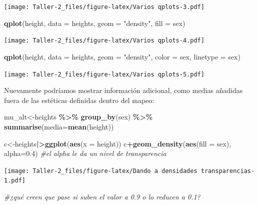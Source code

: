 \documentclass[
]{article}
\newenvironment{Shaded}{\begin{snugshade}}{\end{snugshade}}
\newcommand{\AttributeTok}[1]{\textcolor[rgb]{0.13,0.29,0.53}{#1}}
\newcommand{\CommentTok}[1]{\textcolor[rgb]{0.56,0.35,0.01}{\textit{#1}}}
\newcommand{\FloatTok}[1]{\textcolor[rgb]{0.00,0.00,0.81}{#1}}
\newcommand{\FunctionTok}[1]{\textcolor[rgb]{0.13,0.29,0.53}{\textbf{#1}}}
\newcommand{\NormalTok}[1]{#1}
\newcommand{\OtherTok}[1]{\textcolor[rgb]{0.56,0.35,0.01}{#1}}
\newcommand{\SpecialCharTok}[1]{\textcolor[rgb]{0.81,0.36,0.00}{\textbf{#1}}}
\newcommand{\StringTok}[1]{\textcolor[rgb]{0.31,0.60,0.02}{#1}}
\begin{document}
\texttt{[image: Taller-2\_files/figure-latex/Varios qplots-3.pdf]}

\begin{Shaded}
\begin{Highlighting}[]
\FunctionTok{qplot}\NormalTok{(height, }\AttributeTok{data =}\NormalTok{ heights, }\AttributeTok{geom =} \StringTok{"density"}\NormalTok{, }\AttributeTok{fill =}\NormalTok{ sex)}
\end{Highlighting}
\end{Shaded}

\texttt{[image: Taller-2\_files/figure-latex/Varios qplots-4.pdf]}

\begin{Shaded}
\begin{Highlighting}[]
\FunctionTok{qplot}\NormalTok{(height, }\AttributeTok{data =}\NormalTok{ heights, }\AttributeTok{geom =} \StringTok{"density"}\NormalTok{, }\AttributeTok{color =}\NormalTok{ sex, }\AttributeTok{linetype =}\NormalTok{ sex)}
\end{Highlighting}
\end{Shaded}

\texttt{[image: Taller-2\_files/figure-latex/Varios qplots-5.pdf]}

Nuevamente podríamos mostrar información adicional, como medias añadidas
fuera de las estéticas definidas dentro del mapeo:

\begin{Shaded}
\begin{Highlighting}[]
\NormalTok{mu\_alt}\OtherTok{\textless{}{-}}\NormalTok{heights }\SpecialCharTok{\%\textgreater{}\%}
  \FunctionTok{group\_by}\NormalTok{(sex) }\SpecialCharTok{\%\textgreater{}\%}
  \FunctionTok{summarise}\NormalTok{(}\AttributeTok{media=}\FunctionTok{mean}\NormalTok{(height))}

\NormalTok{c}\OtherTok{\textless{}{-}}\NormalTok{heights}\SpecialCharTok{|\textgreater{}}\FunctionTok{ggplot}\NormalTok{(}\FunctionTok{aes}\NormalTok{(}\AttributeTok{x =}\NormalTok{ height))}
\NormalTok{c}\SpecialCharTok{+}\FunctionTok{geom\_density}\NormalTok{(}\FunctionTok{aes}\NormalTok{(}\AttributeTok{fill =}\NormalTok{ sex), }\AttributeTok{alpha=}\FloatTok{0.4}\NormalTok{) }\CommentTok{\#el alpha le da un nivel de transparencia }
\end{Highlighting}
\end{Shaded}

\texttt{[image: Taller-2\_files/figure-latex/Dando a densidades transparencias-1.pdf]}

\begin{Shaded}
\begin{Highlighting}[]
\CommentTok{\#¿qué creen que pase si suben el valor a 0.9 o lo reducen a 0.1?}
\end{Highlighting}
\end{Shaded}
\end{document}
